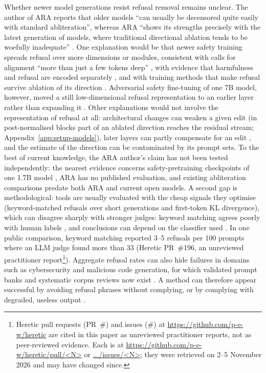 Whether newer model generations resist refusal removal remains unclear. The
author of ARA reports that older models ``can usually be decensored quite
easily with standard abliteration'', whereas ARA ``shows its strengths
precisely with the latest generation of models, where traditional directional
ablation tends to be woefully inadequate'' \cite{weidmann2026ara}. One explanation
would be that newer safety training spreads refusal over more dimensions or
modules, consistent with calls for alignment ``more than just a few tokens
deep'' \cite{qi2025safety}, with evidence that harmfulness and refusal are
encoded separately \cite{zhao2025harmfulness}, and with training methods that
make refusal survive ablation of its direction
\cite{yu2025refusal,xie2025beyond}. Adversarial safety fine-tuning of one 7B
model, however, moved a still low-dimensional refusal representation to an
earlier layer rather than expanding it \cite{lan2026dynamic}. Other
explanations would not involve the representation of refusal at all:
architectural changes can weaken a given edit (in post-normalised blocks part
of an ablated direction reaches the residual stream; Appendix~\ref{app:setup-models}),
later layers can partly compensate for an edit \cite{mcgrath2023hydra}, and the estimate of the
direction can be contaminated by its prompt sets.
To the best of
current knowledge, the ARA author's claim has not been tested independently: the nearest
evidence concerns safety-pretraining checkpoints of one 1.7B model
\cite{agnihotri2025granular}, ARA has no published evaluation, and existing
abliteration comparisons \cite{young2025comparative} predate both ARA and
current open models. A second
gap is methodological: tools are usually evaluated with the cheap signals they
optimise (keyword-matched refusals over short generations and first-token KL
divergence), which can disagree sharply with stronger judges: keyword matching
agrees poorly with human labels \cite{xie2025sorrybench}, and conclusions can
depend on the classifier used \cite{young2026measuring}. In one public
comparison, keyword matching reported 3--5 refusals per 100 prompts where an
LLM judge found more than 33 (Heretic PR~\#196, an unreviewed practitioner
report\footnote{Heretic pull requests (PR~\#) and issues (\#) at
\url{https://github.com/p-e-w/heretic} are cited in this paper as unreviewed
practitioner reports, not as peer-reviewed evidence. Each is at
\url{https://github.com/p-e-w/heretic/pull/<N>} or \url{.../issues/<N>}; they
were retrieved on 2--5 November 2026 and may have changed since.}).
Aggregate refusal rates can also hide failures in domains such as
cybersecurity \cite{hadetskyi2026not} and malicious code generation, for which
validated prompt banks and systematic corpus reviews now exist
\cite{young2026refusal,young2026a,young2026code}. A method can therefore
appear successful by avoiding refusal phrases without complying, or by
complying with degraded, useless output \cite{nikolic2025jailbreak}.


